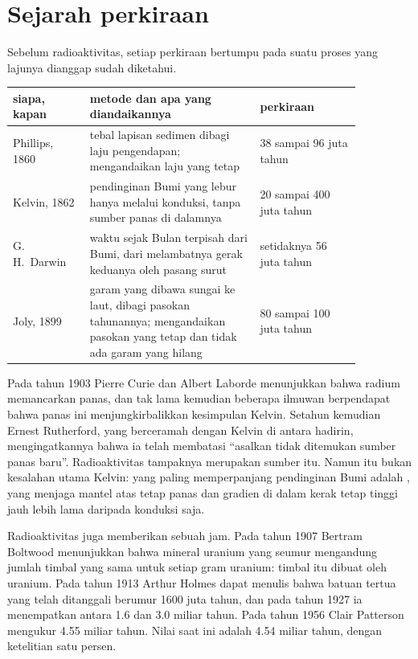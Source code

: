 \section{Sejarah perkiraan}

Sebelum radioaktivitas, setiap perkiraan  bertumpu pada suatu proses
yang lajunya dianggap sudah diketahui.

\begin{center}
\small
\begin{tabular}{|p{0.19\linewidth}|p{0.42\linewidth}|p{0.25\linewidth}|}
\hline
siapa, kapan & metode dan apa yang diandaikannya & perkiraan \\
\hline
Phillips, 1860 & tebal lapisan sedimen dibagi laju pengendapan; mengandaikan laju yang tetap & 38 sampai 96 juta tahun \\
Kelvin, 1862 & pendinginan Bumi yang lebur hanya melalui konduksi, tanpa sumber panas di dalamnya & 20 sampai 400 juta tahun \\
G.\,H.~Darwin & waktu sejak Bulan terpisah dari Bumi, dari melambatnya gerak keduanya oleh pasang surut & setidaknya 56 juta tahun \\
Joly, 1899 & garam yang dibawa sungai ke laut, dibagi pasokan tahunannya; mengandaikan pasokan yang tetap dan tidak ada garam yang hilang & 80 sampai 100 juta tahun \\
\hline
\end{tabular}
\end{center}

\begin{history}
Pada tahun 1903 Pierre Curie dan Albert Laborde menunjukkan bahwa radium
memancarkan panas, dan tak lama kemudian beberapa ilmuwan berpendapat bahwa panas
ini menjungkirbalikkan kesimpulan Kelvin. Setahun kemudian Ernest Rutherford,
yang berceramah dengan Kelvin di antara hadirin, mengingatkannya bahwa ia telah
membatasi  ``asalkan tidak ditemukan sumber panas baru''. Radioaktivitas
tampaknya merupakan sumber itu. Namun itu bukan kesalahan utama Kelvin: yang
paling memperpanjang pendinginan Bumi adalah , yang menjaga mantel
atas tetap panas dan gradien di dalam kerak tetap tinggi jauh lebih lama daripada
konduksi saja.
\end{history}

Radioaktivitas juga memberikan sebuah jam. Pada tahun 1907 Bertram Boltwood
menunjukkan bahwa mineral uranium yang seumur mengandung jumlah timbal yang
sama untuk setiap gram uranium: timbal itu dibuat oleh uranium. Pada tahun 1913
Arthur Holmes dapat menulis bahwa batuan tertua yang telah ditanggali berumur
\num{1600} juta tahun, dan pada tahun 1927 ia menempatkan  antara 1.6
dan 3.0 miliar tahun. Pada tahun 1956 Clair Patterson mengukur 4.55 miliar
tahun. Nilai saat ini adalah 4.54 miliar tahun, dengan ketelitian satu persen.

